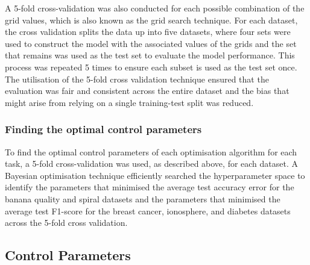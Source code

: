 \documentclass[10pt, conference]{IEEEtran}
\begin{document}
A 5-fold cross-validation was also conducted for each possible combination of the grid values, which is also known as
the grid search technique. For each dataset, the cross validation splits the data up into five datasets, where four
sets were used to construct the model with the associated values of the grids and the set that remains was used as the
test set to evaluate the model performance. This process was repeated 5 times to ensure each subset is used as the test
set once. The utilisation of the 5-fold cross validation technique ensured that the evaluation was fair and consistent
across the entire dataset and the bias that might arise from relying on a single training-test split was reduced.

\subsubsection{Finding the optimal control parameters}
To find the optimal control parameters of each optimisation algorithm for each task, a 5-fold
cross-validation was used, as described above, for each dataset.
A Bayesian optimisation technique efficiently searched the hyperparameter space
to identify the parameters that minimised the average test accuracy error for the banana quality and spiral datasets
and the parameters that minimised the average test F1-score for the breast cancer, ionosphere, and diabetes datasets
across the 5-fold cross validation.

\subsection{Control Parameters} \label{section: control_parameters}
\end{document}
